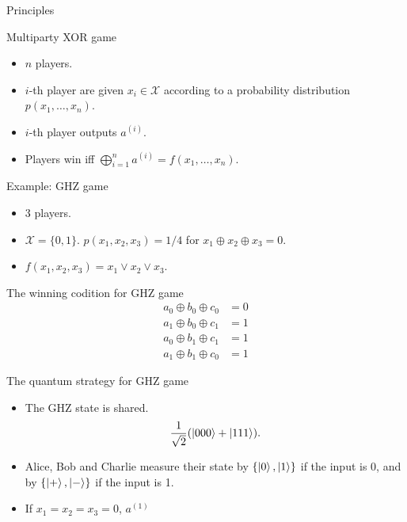 \documentclass{beamer}
\begin{document}
\begin{frame}{Principles}
\end{frame}

\begin{frame}{Multiparty XOR game}
\begin{itemize}
\setlength{\itemsep}{2em}
\item $n$ players.
\item $i$-th player are given $x_i\in\mathcal{X}$ according to a probability distribution $p(x_1,\dotsc,x_n)$.
\item $i$-th player outputs $a^{(i)}$.
\item Players win iff $\bigoplus_{i=1}^n a^{(i)} = f(x_1,\dotsc,x_n)$.
\end{itemize}

\vspace{1em}
Example: GHZ game
\begin{itemize}
\setlength{\itemsep}{1em}
\item 3 players.
\item $\mathcal{X}=\{0,1\}$. $p(x_1,x_2,x_3) = 1/4$ for $x_1\oplus x_2\oplus x_3=0$.
\item $f(x_1,x_2,x_3) = x_1\vee x_2\vee x_3$.
\end{itemize}
\end{frame}

\begin{frame}{The winning codition for GHZ game}
\begin{align*}
a_0\oplus b_0 \oplus c_0 &= 0\\
a_1\oplus b_0 \oplus c_1 &= 1\\
a_0\oplus b_1 \oplus c_1 &= 1\\
a_1\oplus b_1 \oplus c_0 &= 1
\end{align*}
\end{frame}

\begin{frame}{The quantum strategy for GHZ game}
\begin{itemize}
\setlength{\itemsep}{1em}
\item The GHZ state is shared.
\begin{equation*}
\frac1{\sqrt{2}}(\ket{000}+\ket{111}).
\end{equation*}
\item Alice, Bob and Charlie measure their state by $\{\ket{0}, \ket{1}\}$ if the input is 0, and by $\{\ket{+}, \ket{-}\}$ if the input is 1.
\item If $x_1=x_2=x_3=0$, $a^{(1)}$
\end{itemize}
\end{frame}
\end{document}
